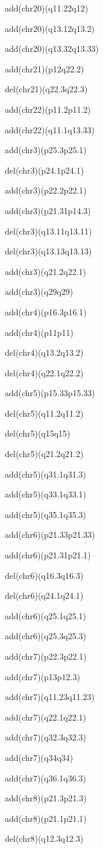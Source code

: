 \documentclass[]{article}
\begin{document}
add(chr20)(q11.22q12)

add(chr20)(q13.12q13.2)

add(chr20)(q13.32q13.33)

add(chr21)(p12q22.2)

del(chr21)(q22.3q22.3)

add(chr22)(p11.2p11.2)

add(chr22)(q11.1q13.33)

add(chr3)(p25.3p25.1)

del(chr3)(p24.1p24.1)

add(chr3)(p22.2p22.1)

add(chr3)(p21.31p14.3)

del(chr3)(q13.11q13.11)

del(chr3)(q13.13q13.13)

add(chr3)(q21.2q22.1)

add(chr3)(q29q29)

add(chr4)(p16.3p16.1)

add(chr4)(p11p11)

del(chr4)(q13.2q13.2)

del(chr4)(q22.1q22.2)

add(chr5)(p15.33p15.33)

del(chr5)(q11.2q11.2)

del(chr5)(q15q15)

del(chr5)(q21.2q21.2)

add(chr5)(q31.1q31.3)

add(chr5)(q33.1q33.1)

add(chr5)(q35.1q35.3)

add(chr6)(p21.33p21.33)

add(chr6)(p21.31p21.1)

del(chr6)(q16.3q16.3)

del(chr6)(q24.1q24.1)

add(chr6)(q25.1q25.1)

add(chr6)(q25.3q25.3)

add(chr7)(p22.3p22.1)

add(chr7)(p13p12.3)

add(chr7)(q11.23q11.23)

add(chr7)(q22.1q22.1)

add(chr7)(q32.3q32.3)

add(chr7)(q34q34)

add(chr7)(q36.1q36.3)

add(chr8)(p21.3p21.3)

add(chr8)(p21.1p21.1)

del(chr8)(q12.3q12.3)
\end{document}
